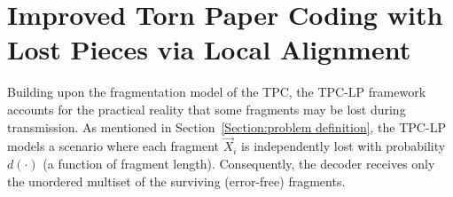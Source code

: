 \documentclass[journal,letterpaper,onecolumn,11pt]{IEEEtran}
\newcommand{\red}[1]{\textcolor{red}{#1}}
\begin{document}
\section{Improved Torn Paper Coding with Lost Pieces via Local Alignment}\label{section:compare capacity for tpclp}
Building upon the fragmentation model of the TPC, the TPC-LP framework accounts for the practical reality that some fragments may be lost during transmission.
As mentioned in Section~\ref{Section:problem definition}, the TPC-LP~\cite{ravi2024recovering} models a scenario where each fragment $\vec{X}_i$ is independently lost with probability $d(\cdot)$ (a function of fragment length). 
Consequently, the decoder receives only the unordered multiset of the surviving (error-free) fragments.
\end{document}
